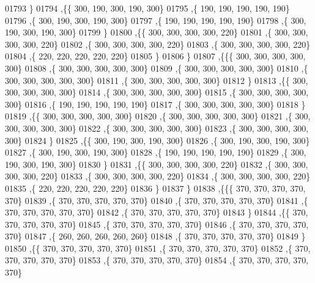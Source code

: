 \begin{DoxyCode}
01793    \}
01794   ,\{\{   300,   190,   300,   190,   300\}
01795    ,\{   190,   190,   190,   190,   190\}
01796    ,\{   300,   190,   300,   190,   300\}
01797    ,\{   190,   190,   190,   190,   190\}
01798    ,\{   300,   190,   300,   190,   300\}
01799    \}
01800   ,\{\{   300,   300,   300,   300,   220\}
01801    ,\{   300,   300,   300,   300,   220\}
01802    ,\{   300,   300,   300,   300,   220\}
01803    ,\{   300,   300,   300,   300,   220\}
01804    ,\{   220,   220,   220,   220,   220\}
01805    \}
01806   \}
01807  ,\{\{\{   300,   300,   300,   300,   300\}
01808    ,\{   300,   300,   300,   300,   300\}
01809    ,\{   300,   300,   300,   300,   300\}
01810    ,\{   300,   300,   300,   300,   300\}
01811    ,\{   300,   300,   300,   300,   300\}
01812    \}
01813   ,\{\{   300,   300,   300,   300,   300\}
01814    ,\{   300,   300,   300,   300,   300\}
01815    ,\{   300,   300,   300,   300,   300\}
01816    ,\{   190,   190,   190,   190,   190\}
01817    ,\{   300,   300,   300,   300,   300\}
01818    \}
01819   ,\{\{   300,   300,   300,   300,   300\}
01820    ,\{   300,   300,   300,   300,   300\}
01821    ,\{   300,   300,   300,   300,   300\}
01822    ,\{   300,   300,   300,   300,   300\}
01823    ,\{   300,   300,   300,   300,   300\}
01824    \}
01825   ,\{\{   300,   190,   300,   190,   300\}
01826    ,\{   300,   190,   300,   190,   300\}
01827    ,\{   300,   190,   300,   190,   300\}
01828    ,\{   190,   190,   190,   190,   190\}
01829    ,\{   300,   190,   300,   190,   300\}
01830    \}
01831   ,\{\{   300,   300,   300,   300,   220\}
01832    ,\{   300,   300,   300,   300,   220\}
01833    ,\{   300,   300,   300,   300,   220\}
01834    ,\{   300,   300,   300,   300,   220\}
01835    ,\{   220,   220,   220,   220,   220\}
01836    \}
01837   \}
01838  ,\{\{\{   370,   370,   370,   370,   370\}
01839    ,\{   370,   370,   370,   370,   370\}
01840    ,\{   370,   370,   370,   370,   370\}
01841    ,\{   370,   370,   370,   370,   370\}
01842    ,\{   370,   370,   370,   370,   370\}
01843    \}
01844   ,\{\{   370,   370,   370,   370,   370\}
01845    ,\{   370,   370,   370,   370,   370\}
01846    ,\{   370,   370,   370,   370,   370\}
01847    ,\{   260,   260,   260,   260,   260\}
01848    ,\{   370,   370,   370,   370,   370\}
01849    \}
01850   ,\{\{   370,   370,   370,   370,   370\}
01851    ,\{   370,   370,   370,   370,   370\}
01852    ,\{   370,   370,   370,   370,   370\}
01853    ,\{   370,   370,   370,   370,   370\}
01854    ,\{   370,   370,   370,   370,   370\}

\end{DoxyCode}

